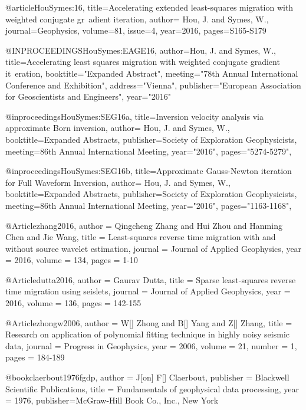 @article{HouSymes:16,
title={Accelerating extended least-squares migration with weighted conjugate gr\
adient iteration},
author= {Hou, J. and Symes, W.},
journal={Geophysics},
volume={81},
issue={4},
year={2016},
pages={S165-S179}
}

@INPROCEEDINGS{HouSymes:EAGE16,
author={Hou, J. and Symes, W.},
title={Accelerating least squares migration with weighted conjugate gradient it\
eration},
booktitle="Expanded Abstract",
meeting="78th Annual International Conference and Exhibition",
address="Vienna",
publisher="European Association for Geoscientists and Engineers",
year="2016"}

@inproceedings{HouSymes:SEG16a,
title={Inversion velocity analysis via approximate Born inversion},
author= {Hou, J. and Symes, W.},
booktitle={Expanded Abstracts},
publisher={Society of Exploration Geophysicists},
meeting={86th Annual International Meeting},
year="2016",
pages="5274-5279",
}

@inproceedings{HouSymes:SEG16b,
title={Approximate Gauss-Newton iteration for Full Waveform Inversion},
author= {Hou, J. and Symes, W.},
booktitle={Expanded Abstracts},
publisher={Society of Exploration Geophysicists},
meeting={86th Annual International Meeting},
year="2016",
pages="1163-1168",
}

@Article{zhang2016,
  author = 	 {Qingcheng Zhang and Hui Zhou and Hanming Chen and Jie Wang},
  title = 	 {Least-squares reverse time migration with and without source wavelet estimation},
  journal = 	 {Journal of Applied Geophysics},
  year = 	 2016,
  volume = 	 134,
  pages = 	 {1-10}}
  

@Article{dutta2016,
  author = 	 {Gaurav Dutta},
  title = 	 {Sparse least-squares reverse time migration using seislets},
  journal = 	 {Journal of Applied Geophysics},
  year = 	 2016,
  volume = 	 136,
  pages = 	 {142-155}}

@Article{zhongw2006,
  author = 	 {W[] Zhong and B[] Yang and Z[] Zhang},
  title = 	 {Research on application of polynomial fitting technique in highly noisy seismic data},
  journal = 	 {Progress in Geophysics},
  year = 	 2006,
  volume = 	 21,
  number = 	 1,
  pages = 	 {184-189}}

@book{claerbout1976fgdp,
   author = {J[on] F[] Claerbout},
   publisher = {Blackwell Scientific Publications},
   title = {Fundamentals of geophysical data processing},
   year = {1976},
   publisher={McGraw-Hill Book Co., Inc., New York}
}


